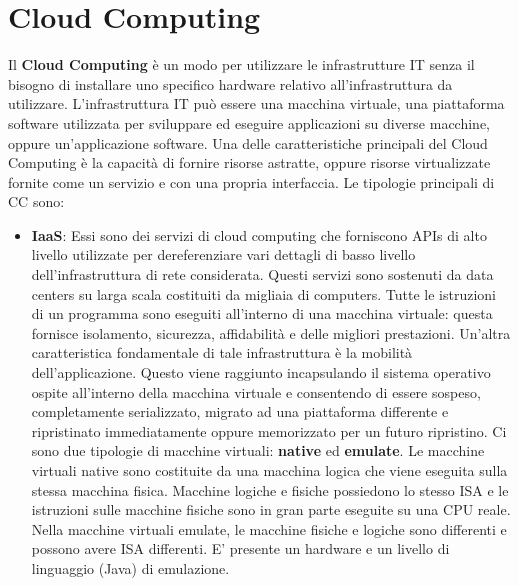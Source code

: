 \chapter{Cloud Computing}
Il \textbf{Cloud Computing} è un modo per utilizzare le infrastrutture IT senza il bisogno di installare uno specifico hardware relativo all'infrastruttura da utilizzare. L'infrastruttura IT può essere una macchina virtuale, una piattaforma software utilizzata per sviluppare ed eseguire applicazioni su diverse macchine, oppure un'applicazione software. Una delle caratteristiche principali del Cloud Computing è la capacità di fornire risorse astratte, oppure risorse virtualizzate fornite come un servizio e con una propria interfaccia. Le tipologie principali di CC sono:
\begin{itemize}
    \item \textbf{IaaS}: Essi sono dei servizi di cloud computing che forniscono APIs di alto livello utilizzate per dereferenziare vari dettagli di basso livello dell'infrastruttura di rete considerata. Questi servizi sono sostenuti da data centers su larga scala costituiti da migliaia di computers. Tutte le istruzioni di un programma sono eseguiti all'interno di una macchina virtuale: questa fornisce isolamento, sicurezza, affidabilità e delle migliori prestazioni. Un'altra caratteristica fondamentale di tale infrastruttura è la mobilità dell'applicazione. Questo viene raggiunto incapsulando il sistema operativo ospite all'interno della macchina virtuale e consentendo di essere sospeso, completamente serializzato, migrato ad una piattaforma differente e ripristinato immediatamente oppure memorizzato per un futuro ripristino. Ci sono due tipologie di macchine virtuali: \textbf{native} ed \textbf{emulate}. Le macchine virtuali native sono costituite da una macchina logica che viene eseguita sulla stessa macchina fisica. Macchine logiche e fisiche possiedono lo stesso ISA e le istruzioni sulle macchine fisiche sono in gran parte eseguite su una CPU reale. Nella macchine virtuali emulate, le macchine fisiche e logiche sono differenti e possono avere ISA differenti. E' presente un hardware e un livello di linguaggio (Java) di emulazione.

\end{itemize}
